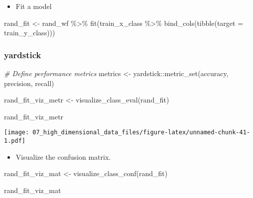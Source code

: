 \documentclass[
]{book}
\newenvironment{Shaded}{\begin{snugshade}}{\end{snugshade}}
\newcommand{\AttributeTok}[1]{\textcolor[rgb]{0.77,0.63,0.00}{#1}}
\newcommand{\CommentTok}[1]{\textcolor[rgb]{0.56,0.35,0.01}{\textit{#1}}}
\newcommand{\FunctionTok}[1]{\textcolor[rgb]{0.00,0.00,0.00}{#1}}
\newcommand{\NormalTok}[1]{#1}
\newcommand{\OtherTok}[1]{\textcolor[rgb]{0.56,0.35,0.01}{#1}}
\newcommand{\SpecialCharTok}[1]{\textcolor[rgb]{0.00,0.00,0.00}{#1}}
\providecommand{\tightlist}{%
  \setlength{\itemsep}{0pt}\setlength{\parskip}{0pt}}
\begin{document}
\begin{itemize}
\tightlist
\item
  Fit a model
\end{itemize}

\begin{Shaded}
\begin{Highlighting}[]
\NormalTok{rand\_fit }\OtherTok{\textless{}{-}}\NormalTok{ rand\_wf }\SpecialCharTok{\%\textgreater{}\%} \FunctionTok{fit}\NormalTok{(train\_x\_class }\SpecialCharTok{\%\textgreater{}\%} \FunctionTok{bind\_cols}\NormalTok{(}\FunctionTok{tibble}\NormalTok{(}\AttributeTok{target =}\NormalTok{ train\_y\_class)))}
\end{Highlighting}
\end{Shaded}

\hypertarget{yardstick-2}{%
\subsubsection{yardstick}\label{yardstick-2}}

\begin{Shaded}
\begin{Highlighting}[]
\CommentTok{\# Define performance metrics}
\NormalTok{metrics }\OtherTok{\textless{}{-}}\NormalTok{ yardstick}\SpecialCharTok{::}\FunctionTok{metric\_set}\NormalTok{(accuracy, precision, recall)}

\NormalTok{rand\_fit\_viz\_metr }\OtherTok{\textless{}{-}} \FunctionTok{visualize\_class\_eval}\NormalTok{(rand\_fit)}

\NormalTok{rand\_fit\_viz\_metr}
\end{Highlighting}
\end{Shaded}

\texttt{[image: 07\_high\_dimensional\_data\_files/figure-latex/unnamed-chunk-41-1.pdf]}

\begin{itemize}
\tightlist
\item
  Visualize the confusion matrix.
\end{itemize}

\begin{Shaded}
\begin{Highlighting}[]
\NormalTok{rand\_fit\_viz\_mat }\OtherTok{\textless{}{-}} \FunctionTok{visualize\_class\_conf}\NormalTok{(rand\_fit)}

\NormalTok{rand\_fit\_viz\_mat}
\end{Highlighting}
\end{Shaded}
\end{document}
